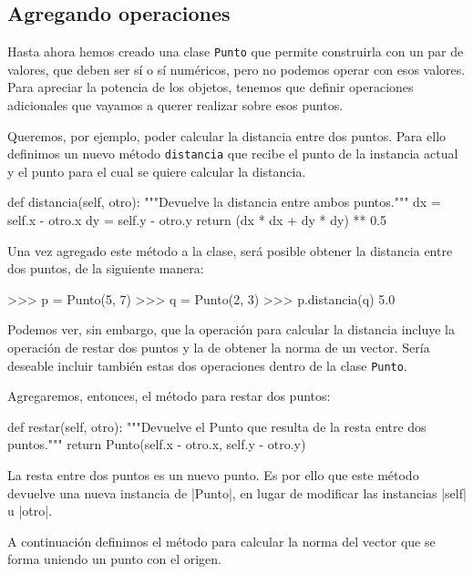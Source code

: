 \subsection{Agregando operaciones}

Hasta ahora hemos creado una clase \lstinline!Punto! que permite
construirla con un par de valores, que deben ser sí o sí numéricos, pero no
podemos operar con esos valores.  Para apreciar la potencia de los objetos,
tenemos que definir operaciones adicionales que vayamos a querer realizar
sobre esos puntos.

Queremos, por ejemplo, poder calcular la distancia entre dos puntos.  Para
ello definimos un nuevo método \lstinline!distancia! que recibe el punto de
la instancia actual y el punto para el cual se quiere calcular la
distancia.

\begin{codigo-python-sn}
    def distancia(self, otro):
        """Devuelve la distancia entre ambos puntos."""
        dx = self.x - otro.x
        dy = self.y - otro.y
        return (dx * dx + dy * dy) ** 0.5
\end{codigo-python-sn}

Una vez agregado este método a la clase, será posible obtener la distancia
entre dos puntos, de la siguiente manera:

\begin{codigo-python-sn}
>>> p = Punto(5, 7)
>>> q = Punto(2, 3)
>>> p.distancia(q)
5.0
\end{codigo-python-sn}

Podemos ver, sin embargo, que la operación para calcular la distancia
incluye la operación de restar dos puntos y la de obtener la norma de un
vector. Sería deseable incluir también estas dos operaciones dentro de la
clase \lstinline!Punto!.

Agregaremos, entonces, el método para restar dos puntos:

\begin{codigo-python-sn}
    def restar(self, otro):
        """Devuelve el Punto que resulta de la resta
           entre dos puntos."""
        return Punto(self.x - otro.x, self.y - otro.y)
\end{codigo-python-sn}

La resta entre dos puntos es un nuevo punto.  Es por ello que este método
devuelve una nueva instancia de |Punto|, en lugar de modificar las instancias
|self| u |otro|.

A continuación definimos el método para calcular la norma del vector que
se forma uniendo un punto con el origen.

